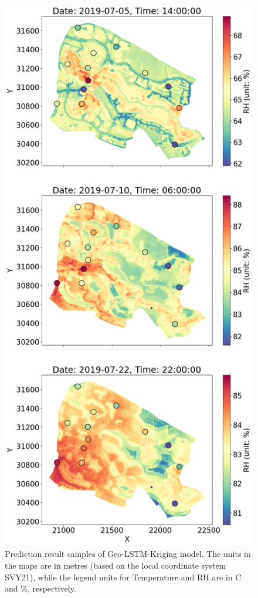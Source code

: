 \documentclass[a4paper,fleqn]{cas-sc}
\begin{document}
\begin{figure}[!h]
    \includegraphics[scale=0.32]{figs/new_figs/RH_campusplot.png}
	\caption{Prediction result samples of Geo-LSTM-Kriging model. The units in the maps are in metres (based on the local coordinate system SVY21), while the legend units for Temperature and RH are in \textdegree C and \%, respectively.}
	\label{FIG:predictionResultCampus}
\end{figure}
\end{document}
